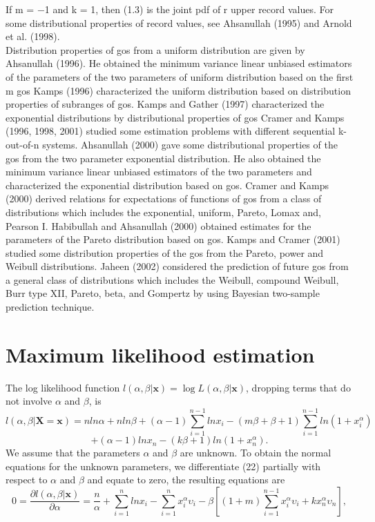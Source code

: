 \documentclass[12pt,a4paper]{article}
\begin{document}
 If m = −1 and k = 1, then (1.3) is the joint pdf of r upper record values. For some distributional properties of record values, see Ahsanullah (1995) and Arnold et al. (1998).\\
 Distribution properties of gos from a uniform distribution are given by Ahsanullah (1996). He obtained the minimum variance linear unbiased estimators of the parameters of the two parameters of uniform distribution based on the ﬁrst m gos Kamps (1996) characterized the uniform distribution based on distribution properties of subranges of gos. Kamps and Gather (1997) characterized the exponential distributions by distributional properties of gos Cramer and Kamps (1996, 1998, 2001) studied some estimation problems with different sequential k-out-of-n systems. Ahsanullah (2000) gave some distributional properties of the gos from the two parameter exponential distribution. He also obtained the minimum variance linear unbiased estimators of the two parameters and characterized the exponential distribution based on gos. Cramer and Kamps (2000) derived relations for expectations of functions of gos from a class of distributions which includes the exponential, uniform, Pareto, Lomax and, Pearson I. Habibullah and Ahsanullah (2000) obtained estimates for the parameters of the Pareto distribution based on gos. Kamps and Cramer (2001) studied some distribution properties of the gos from the Pareto, power and Weibull distributions. Jaheen (2002) considered the prediction of future gos from a general class of distributions which includes the Weibull, compound Weibull, Burr type XII, Pareto, beta, and Gompertz by using Bayesian  two-sample  prediction technique.



\section{Maximum likelihood estimation}
The log likelihood function $l(\alpha, \beta|\mathbf{x})=\log L(\alpha, \beta|\mathbf{x})$, dropping terms that do not involve $\alpha$ and $\beta$, is 
\begin{equation*}
l(\alpha, \beta|\mathbf{X=x})=nln\alpha+nln\beta+(\alpha-1)\sum_{i=1}^{n-1}ln x_{i}-(m\beta+\beta+1)\sum_{i=1}^{n-1}ln(1+x_{i}^{\alpha})
\end{equation*}
\begin{equation}
+(\alpha-1)lnx_{n}-(k\beta+1)ln(1+x_{n}^{\alpha}).
\end{equation}
We assume that the parameters $\alpha$ and $\beta$ are unknown. To obtain the normal equations for the unknown parameters, we differentiate (22) partially with respect to $\alpha$ and $\beta$ and equate to zero, the resulting equations are 
\begin{equation}
0=\frac{\partial l(\alpha, \beta|\mathbf{x})}{\partial \alpha}=\frac{n}{\alpha}+\sum_{i=1}^{n}ln x_{i}-\sum_{i=1}^{n}x_{i}^{\alpha}\upsilon_{i}-\beta\left[(1+m)\sum_{i=1}^{n-1}x_{i}^{\alpha}\upsilon_{i}+k x_{n}^{\alpha}\upsilon_{n}\right],
\label{alfa_mle}
\end{equation}
\end{document}
